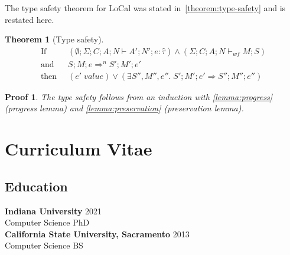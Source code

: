 \documentclass[showabstract,showacknowledgments,showpreface,showdedication,school]{iuphd}
\newtheorem{theorem}{Theorem}[section]
\theoremstyle{nonumberplain}
\newtheorem{nproof}{Proof}
\newcommand{\sysname}[0]{LoCal\xspace}
\newcommand{\ourcalc}[0]{\sysname}
\newcommand{\keywd}[1]{\mathit{#1}}
\newcommand{\EXPR}{\keywd{e}}
\newcommand{\hTYP}{\keywd{\hat{\tau}}}
\newcommand{\STOR}{\keywd{S}}
\newcommand{\stepsto}{\Rightarrow}
\newcommand{\CENV}{\keywd{C}}
\newcommand{\SENV}{\keywd{\Sigma}}
\newcommand{\MENV}{\keywd{M}}
\newcommand{\AENV}{\keywd{A}}
\newcommand{\NENV}{\keywd{N}}
\newcommand{\storewf}[6]{\ensuremath{#1;#2;#3;#4 \vdash_{wf} #5;#6}}
\begin{document}
The type safety theorem for \ourcalc{} was stated in~\ref{theorem:type-safety} and is restated here.

\begin{theorem}[Type safety]
  \begin{displaymath}
  \begin{aligned}
  \text{If} \;\; & (\emptyset;\SENV;\CENV;\AENV;\NENV \vdash \AENV';\NENV';\EXPR : \hTYP) \wedge
                   (\storewf{\SENV}{\CENV}{\AENV}{\NENV}{\MENV}{\STOR}) \\
  \text{and} \;\; & \STOR;\MENV;\EXPR \stepsto^n \STOR';\MENV';\EXPR' \\
  \text{then} \;\; & (\EXPR' \; \mathit{value}) \vee
                     (\exists \STOR'', \MENV'', \EXPR'' . \; \STOR';\MENV';\EXPR' \stepsto \STOR'';\MENV'';\EXPR'')
  \end{aligned}
  \end{displaymath}
\end{theorem}

\begin{nproof}
  The type safety follows from an induction with
  \ref{lemma:progress} (progress lemma) and \ref{lemma:preservation} (preservation lemma).
\end{nproof}










\chapter*{Curriculum Vitae}
\setlength{\parindent}{0pt}

\section*{Education}
\textbf{Indiana University} \hfill 2021 \\
Computer Science PhD  \\
\textbf{California State University, Sacramento} \hfill 2013 \\
Computer Science BS  \\
\thispagestyle{empty}
\end{document}
